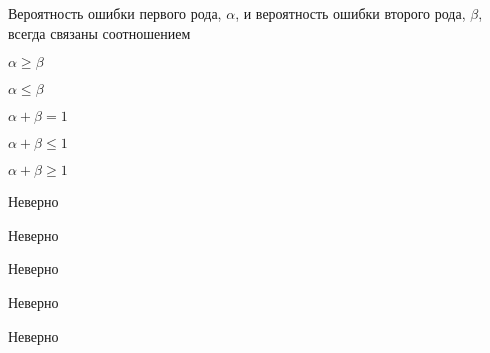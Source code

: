 
\begin{question}
Вероятность ошибки первого рода, \(\alpha\), и вероятность ошибки
второго рода, \(\beta\), всегда связаны соотношением
\begin{answerlist}
  \item \(\alpha\geq \beta\)
  \item \(\alpha\leq \beta\)
  \item \(\alpha+\beta=1\)
  \item \(\alpha+\beta \leq 1\)
  \item \(\alpha+\beta \geq 1\)
\end{answerlist}
\end{question}

\begin{solution}
\begin{answerlist}
  \item Неверно
  \item Неверно
  \item Неверно
  \item Неверно
  \item Неверно
\end{answerlist}
\end{solution}

